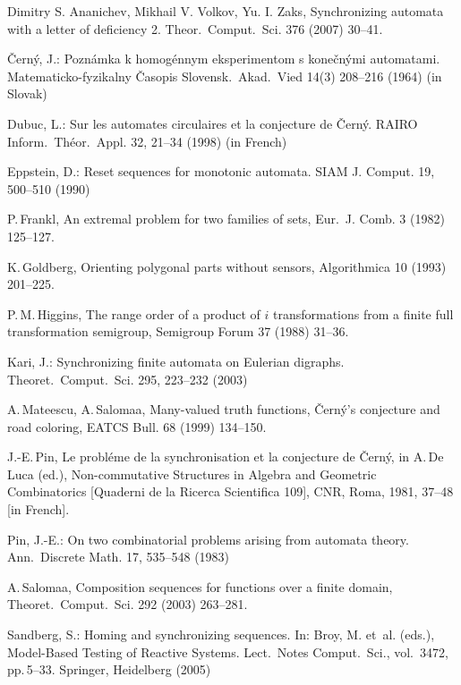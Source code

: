 \documentclass[11pt]{llncs}
\begin{document}
\begin{thebibliography}{99}
Dimitry S. Ananichev, Mikhail V. Volkov, Yu. I. Zaks,
Synchronizing automata with a letter of deficiency 2. Theor.\ Comput.\ Sci.
376 (2007)  30--41.

\v{C}ern\'{y}, J.: Pozn\'{a}mka k homog\'{e}nnym eksperimentom s
kone\v{c}n\'{y}mi automatami. Matematicko-fyzikalny \v{C}asopis
Slovensk.\ Akad.\ Vied 14(3) 208--216 (1964) (in Slovak)

Dubuc, L.: Sur les automates circulaires et la conjecture de
\v{C}ern\'y. RAIRO Inform.\ Th\'eor.\ Appl. 32, 21--34 (1998) (in
French)

Eppstein, D.: Reset sequences for monotonic automata. SIAM J.
Comput. 19, 500--510 (1990)

P.\,Frankl, An extremal problem for two families of sets, Eur.\ J.
Comb. 3 (1982) 125--127.

K.\,Goldberg, Orienting polygonal parts without sensors,
Algorithmica 10 (1993) 201--225.

P.\,M.\,Higgins, The range order of a product of $i$
transformations from a finite full transformation semigroup,
Semigroup Forum 37 (1988) 31--36.

Kari, J.: Synchronizing finite automata on Eulerian digraphs.
Theoret.\ Comput.\ Sci. 295, 223--232 (2003)

A.\,Mateescu, A.\,Salomaa, Many-valued truth functions,
\v{C}ern\'{y}'s conjecture and road coloring, EATCS Bull. 68
(1999) 134--150.

J.-E.\,Pin, Le probl\'eme de la synchronisation et la conjecture
de \v{C}ern\'{y}, in A.\,De\,Luca (ed.), Non-commutative
Structures in Algebra and Geometric Combinatorics [Quaderni de la
Ricerca Scientifica 109], CNR, Roma, 1981, 37--48 [in French].

Pin, J.-E.: On two combinatorial problems arising from automata
theory. Ann.\ Discrete Math. 17, 535--548 (1983)

A.\,Salomaa, Composition sequences for functions over a finite
domain, Theoret.\ Comput.\ Sci. 292 (2003) 263--281.

Sandberg, S.: Homing and synchronizing sequences. In: Broy, M.
et~al. (eds.), Model-Based Testing of Reactive Systems. Lect.\
Notes Comput.\ Sci., vol.\, 3472, pp.\,5--33. Springer, Heidelberg
(2005)


\end{thebibliography}
\end{document}
